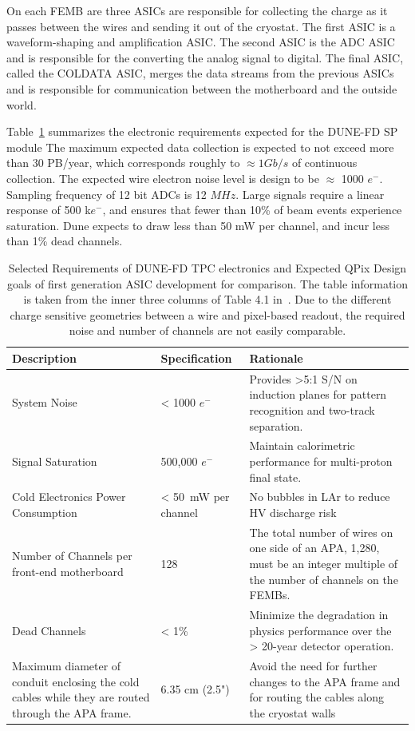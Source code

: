 On each FEMB are three ASICs are responsible for collecting the charge as it passes between the wires and sending it out of the cryostat.
The first ASIC is a waveform-shaping and amplification ASIC.
The second ASIC is the ADC ASIC and is responsible for the converting the analog signal to digital.
The final ASIC, called the COLDATA ASIC, merges the data streams from the previous ASICs and is responsible for communication between the motherboard and the outside world.

Table~\ref{tab:dune_tpc_elec} summarizes the electronic requirements expected for the DUNE-FD SP module
The maximum expected data collection is expected to not exceed more than 30 PB/year, which corresponds roughly to $\approx 1 Gb/s$ of continuous collection.
The expected wire electron noise level is design to be $\approx$ 1000 $e^{-}$.
Sampling frequency of 12 bit ADCs is 12 $\unit{MHz}$.
Large signals require a linear response of 500 k$e^{-}$, and ensures that fewer than 10\% of beam events experience saturation.
Dune expects to draw less than 50 mW per channel, and incur less than 1\% dead channels.

\begin{table}
\begin{center}
\begin{tabular}{|| p{50mm} | p{40mm} | p{60mm} ||}
 \hline
 Description & Specification & Rationale \\ [0.5ex]
 \hline\hline
  System Noise & < 1000 $e^{-}$ & Provides >5:1 S/N on induction planes for pattern recognition and two-track separation. \\
 \hline
  Signal Saturation & 500,000 $e^{-}$ & Maintain calorimetric performance for multi-proton final state. \\
 \hline
  Cold Electronics Power Consumption & < 50~\unit{mW} per channel & No bubbles in LAr to reduce HV discharge risk\\
 \hline
  Number of Channels per front-end motherboard & 128 &  The total number of wires on one side of an APA, 1,280, must be an integer multiple of the number of channels on the FEMBs. \\
 \hline
  Dead Channels & < 1\% & Minimize the degradation in physics performance over the > 20-year detector operation. \\
 \hline
  Maximum diameter of conduit enclosing the cold cables while they are routed through the APA frame. & 6.35 cm (2.5") & Avoid the need for further changes to the APA frame and for routing the cables along the cryostat walls \\
 \hline
\end{tabular}
\caption{Selected Requirements of DUNE-FD TPC electronics and Expected QPix Design goals of first generation ASIC development for comparison.
The table information is taken from the inner three columns of Table 4.1 in~\citep{DUNE-FD_TDRv4:Abi_2020}.
Due to the different charge sensitive geometries between a wire and pixel-based readout, the required noise and number of channels are not easily comparable.
}
\label{tab:dune_tpc_elec}
\end{center}
\end{table}

